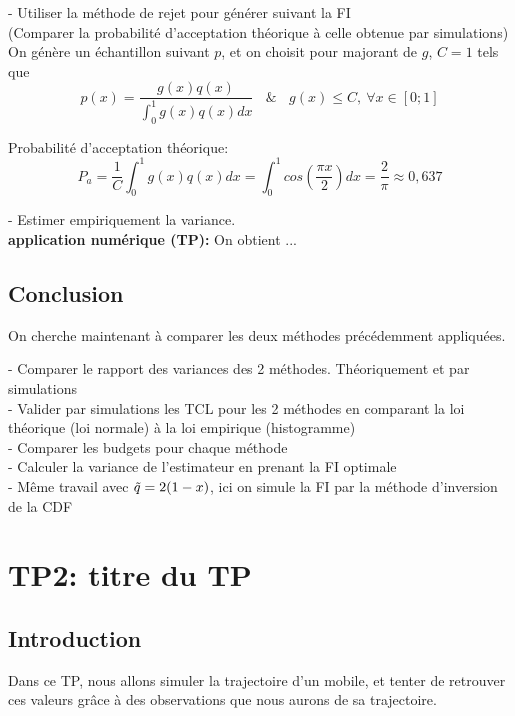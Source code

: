 \documentclass{article}
\begin{document}
- Utiliser la méthode de rejet pour  générer suivant la FI \\ (Comparer la probabilité d’acceptation théorique à celle obtenue par simulations)\\
On génère un échantillon suivant $p$, et on choisit pour majorant de $g$, $C=1$ tels que 
$$p(x) = \frac{g(x)q(x)}{\int_0^1 g(x)q(x)dx}\ \ \ \ \&\ \ \ \ g(x) \leq C,\ \forall x \in [0;1] $$

Probabilité d'acceptation théorique: 
$$P_a = \frac1C \int_0^1 g(x)q(x)dx 
= \int_0^1 cos(\frac{\pi x}{2})dx 
=\frac{2}{\pi} 
\approx 0,637$$

- Estimer empiriquement la variance.\\
\textbf{application numérique (TP):} On obtient ...

\subsection{Conclusion}
On cherche maintenant à comparer les deux méthodes précédemment appliquées.

- Comparer le rapport des variances des 2 méthodes. Théoriquement et par simulations\\


- Valider par simulations les TCL pour les 2 méthodes en comparant la loi théorique (loi normale) à la loi empirique (histogramme)\\


- Comparer les budgets pour chaque méthode\\


- Calculer la variance de l’estimateur en prenant la FI optimale\\


- Même travail avec $\Tilde{q}=2(1-x)$, ici on simule la FI par la méthode d’inversion de la CDF\\









\newpage
\section{TP2: titre du TP}
\subsection{Introduction}
Dans ce TP, nous allons simuler la trajectoire d'un mobile, et tenter de retrouver ces valeurs grâce à des observations que nous aurons de sa trajectoire.
\end{document}
